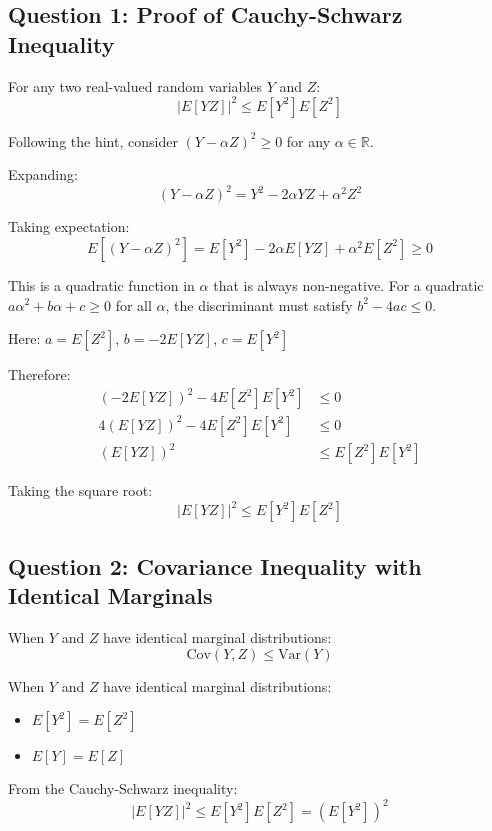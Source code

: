 \subsection*{Question 1: Proof of Cauchy-Schwarz Inequality}

\begin{theorem}
For any two real-valued random variables $Y$ and $Z$:
\[
|E[YZ]|^2 \leq E[Y^2]E[Z^2]
\]
\end{theorem}


Following the hint, consider $(Y - \alpha Z)^2 \geq 0$ for any $\alpha \in \mathbb{R}$.

Expanding:
\[
(Y - \alpha Z)^2 = Y^2 - 2\alpha YZ + \alpha^2 Z^2
\]

Taking expectation:
\[
E[(Y - \alpha Z)^2] = E[Y^2] - 2\alpha E[YZ] + \alpha^2 E[Z^2] \geq 0
\]

This is a quadratic function in $\alpha$ that is always non-negative. For a quadratic $a\alpha^2 + b\alpha + c \geq 0$ for all $\alpha$, the discriminant must satisfy $b^2 - 4ac \leq 0$.

Here: $a = E[Z^2]$, $b = -2E[YZ]$, $c = E[Y^2]$

Therefore:
\begin{align*}
(-2E[YZ])^2 - 4E[Z^2]E[Y^2] &\leq 0\\
4(E[YZ])^2 - 4E[Z^2]E[Y^2] &\leq 0\\
(E[YZ])^2 &\leq E[Z^2]E[Y^2]
\end{align*}

Taking the square root:
\[
|E[YZ]|^2 \leq E[Y^2]E[Z^2]
\]


\subsection*{Question 2: Covariance Inequality with Identical Marginals}

\begin{theorem}
When $Y$ and $Z$ have identical marginal distributions:
\[
\text{Cov}(Y,Z) \leq \text{Var}(Y)
\]
\end{theorem}


When $Y$ and $Z$ have identical marginal distributions:
\begin{itemize}
\item $E[Y^2] = E[Z^2]$
\item $E[Y] = E[Z]$
\end{itemize}

From the Cauchy-Schwarz inequality:
\[
|E[YZ]|^2 \leq E[Y^2]E[Z^2] = (E[Y^2])^2
\]


